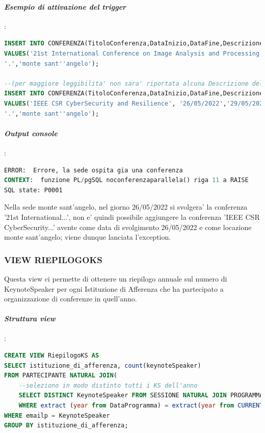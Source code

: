 \documentclass[a4page]{article}
\begin{document}
\paragraph{\textit{Esempio di attivazione del trigger}} :
\begin{lstlisting}[language=SQL,
        deletekeywords={IDENTITY,INT},
        morekeywords={clustered},    
        framesep=10pt,
        framextopmargin=10pt]
INSERT INTO CONFERENZA(TitoloConferenza,DataInizio,DataFine,Descrizione,NomeSede)
VALUES('21st International Conference on Image Analysis and Processing', '23/05/2022','27/05/2022',
'.','monte sant''angelo');

--(per maggiore leggibilita' non sara' riportata alcuna Descrizione della conferenza).	   
INSERT INTO CONFERENZA(TitoloConferenza,DataInizio,DataFine,Descrizione,NomeSede)
VALUES('IEEE CSR CyberSecurity and Resilience', '26/05/2022','29/05/2022', 
'.','monte sant''angelo');
\end{lstlisting}
\paragraph{\textit{Output console}}:
\begin{lstlisting}[language=SQL,
        deletekeywords={IDENTITY,INT},
        morekeywords={clustered},    
        framesep=10pt,
        framextopmargin=10pt]
ERROR:  Errore, la sede ospita gia una conferenza
CONTEXT:  funzione PL/pgSQL noconferenzaparallela() riga 11 a RAISE
SQL state: P0001
\end{lstlisting}
Nella sede monte sant'angelo, nel giorno 26/05/2022 si svolgera' la conferenza  '21st International...', non e' quindi possibile aggiungere la conferenza 'IEEE CSR CyberSecurity...' avente come data di svolgimento 26/05/2022 e come locazione monte sant'angelo; viene dunque lanciata l'exception.
\subsubsection{VIEW RIEPILOGOKS}
Questa view ci permette di ottenere un riepilogo annuale sul numero di KeynoteSpeaker per ogni Istituzione di Afferenza che ha partecipato a organizzazione di conferenze in quell'anno.
\vspace{0.2cm}
\paragraph{\textit{Struttura view}}:
\begin{lstlisting}[language=SQL,
        deletekeywords={IDENTITY,INT},
        morekeywords={clustered},    
        framesep=10pt,
        framextopmargin=10pt]
CREATE VIEW RiepilogoKS AS
SELECT istituzione_di_afferenza, count(keynoteSpeaker) 
FROM PARTECIPANTE NATURAL JOIN(
	--seleziono in modo distinto tutti i KS dell'anno
	SELECT DISTINCT KeynoteSpeaker FROM SESSIONE NATURAL JOIN PROGRAMMA  
	WHERE extract (year from DataProgramma) = extract(year from CURRENT_DATE)) AS T
WHERE emailp = KeynoteSpeaker
GROUP BY istituzione_di_afferenza;        
\end{lstlisting}
\vspace{-0.3cm}
\end{document}
